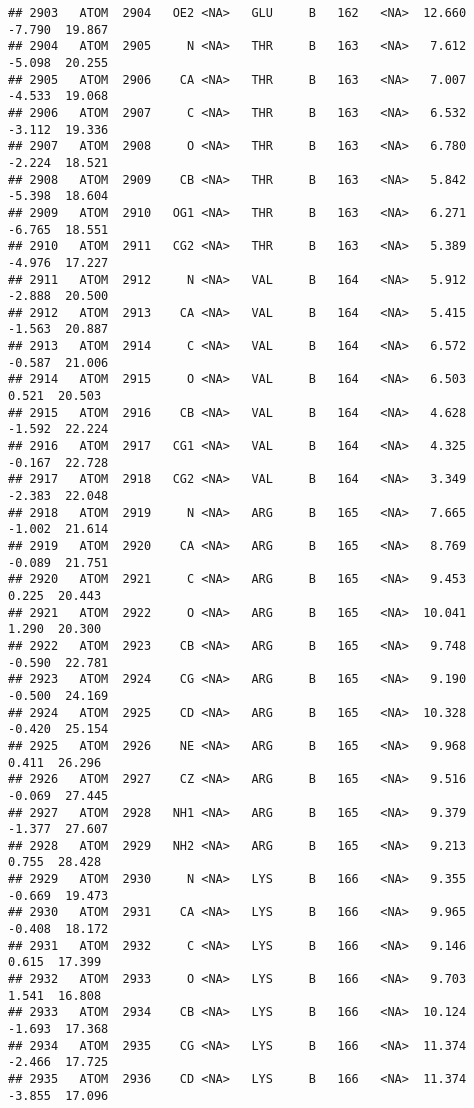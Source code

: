 \documentclass[
]{article}
\begin{document}
\begin{verbatim}
## 2903   ATOM  2904   OE2 <NA>   GLU     B   162   <NA>  12.660  -7.790  19.867
## 2904   ATOM  2905     N <NA>   THR     B   163   <NA>   7.612  -5.098  20.255
## 2905   ATOM  2906    CA <NA>   THR     B   163   <NA>   7.007  -4.533  19.068
## 2906   ATOM  2907     C <NA>   THR     B   163   <NA>   6.532  -3.112  19.336
## 2907   ATOM  2908     O <NA>   THR     B   163   <NA>   6.780  -2.224  18.521
## 2908   ATOM  2909    CB <NA>   THR     B   163   <NA>   5.842  -5.398  18.604
## 2909   ATOM  2910   OG1 <NA>   THR     B   163   <NA>   6.271  -6.765  18.551
## 2910   ATOM  2911   CG2 <NA>   THR     B   163   <NA>   5.389  -4.976  17.227
## 2911   ATOM  2912     N <NA>   VAL     B   164   <NA>   5.912  -2.888  20.500
## 2912   ATOM  2913    CA <NA>   VAL     B   164   <NA>   5.415  -1.563  20.887
## 2913   ATOM  2914     C <NA>   VAL     B   164   <NA>   6.572  -0.587  21.006
## 2914   ATOM  2915     O <NA>   VAL     B   164   <NA>   6.503   0.521  20.503
## 2915   ATOM  2916    CB <NA>   VAL     B   164   <NA>   4.628  -1.592  22.224
## 2916   ATOM  2917   CG1 <NA>   VAL     B   164   <NA>   4.325  -0.167  22.728
## 2917   ATOM  2918   CG2 <NA>   VAL     B   164   <NA>   3.349  -2.383  22.048
## 2918   ATOM  2919     N <NA>   ARG     B   165   <NA>   7.665  -1.002  21.614
## 2919   ATOM  2920    CA <NA>   ARG     B   165   <NA>   8.769  -0.089  21.751
## 2920   ATOM  2921     C <NA>   ARG     B   165   <NA>   9.453   0.225  20.443
## 2921   ATOM  2922     O <NA>   ARG     B   165   <NA>  10.041   1.290  20.300
## 2922   ATOM  2923    CB <NA>   ARG     B   165   <NA>   9.748  -0.590  22.781
## 2923   ATOM  2924    CG <NA>   ARG     B   165   <NA>   9.190  -0.500  24.169
## 2924   ATOM  2925    CD <NA>   ARG     B   165   <NA>  10.328  -0.420  25.154
## 2925   ATOM  2926    NE <NA>   ARG     B   165   <NA>   9.968   0.411  26.296
## 2926   ATOM  2927    CZ <NA>   ARG     B   165   <NA>   9.516  -0.069  27.445
## 2927   ATOM  2928   NH1 <NA>   ARG     B   165   <NA>   9.379  -1.377  27.607
## 2928   ATOM  2929   NH2 <NA>   ARG     B   165   <NA>   9.213   0.755  28.428
## 2929   ATOM  2930     N <NA>   LYS     B   166   <NA>   9.355  -0.669  19.473
## 2930   ATOM  2931    CA <NA>   LYS     B   166   <NA>   9.965  -0.408  18.172
## 2931   ATOM  2932     C <NA>   LYS     B   166   <NA>   9.146   0.615  17.399
## 2932   ATOM  2933     O <NA>   LYS     B   166   <NA>   9.703   1.541  16.808
## 2933   ATOM  2934    CB <NA>   LYS     B   166   <NA>  10.124  -1.693  17.368
## 2934   ATOM  2935    CG <NA>   LYS     B   166   <NA>  11.374  -2.466  17.725
## 2935   ATOM  2936    CD <NA>   LYS     B   166   <NA>  11.374  -3.855  17.096

\end{verbatim}
\end{document}
